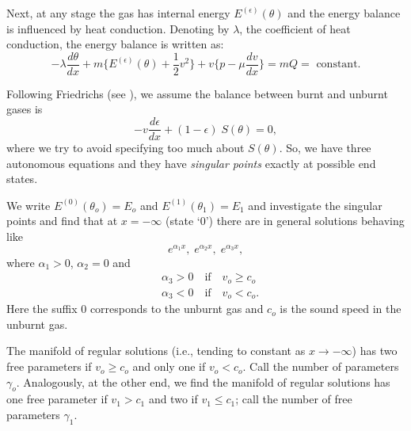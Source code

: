 Next, at any stage the gas has internal energy $E^{(\epsilon)}(\theta)$ and the energy balance is influenced by heat conduction. Denoting by $\lambda$, the coefficient of heat conduction, the energy balance is written as:
$$
-\lambda \frac{d\theta}{dx} + m \{E^{(\epsilon)} (\theta) + \frac{1}{2} v^2\} + v \{p - \mu \frac{dv}{dx}\} = m Q = \text{ constant.}
$$

Following Friedrichs (see \cite{key11}), we assume the balance between burnt and unburnt gases is 
$$
-v\frac{d\epsilon}{dx} + (1-\epsilon) \; S(\theta) = 0,
$$
where we try to avoid specifying too much about $S(\theta)$. So, we have three autonomous equations and they have {\em singular points } exactly at possible end states.

We write $E^{(0)} (\theta_o) = E_o$ and $E^{(1)} (\theta_1) = E_1$ and investigate the singular points and find that at $x = - \infty$ (state `0') there are in general solutions behaving like 
$$
e^{\alpha_1 x}, \; e^{\alpha_2 x}, \; e^{\alpha_3 x},
$$\pageoriginale
where $\alpha_1 > 0$, $\alpha_2 = 0 $ and 
\begin{align*}
& \alpha_3 > 0 \quad \text{if} \quad v_o \geq c_o\\
& \alpha_3 < 0 \quad \text{if} \quad v_o < c_o.
\end{align*}
Here the suffix $0$ corresponds to the unburnt gas and $c_o$ is the sound speed in the unburnt gas.

The manifold of regular solutions (i.e., tending to constant as $x \to - \infty$) has two free parameters if $v_o \geq c_o$ and only one if $v_o < c_o$. Call the number of parameters $\gamma_o$. Analogously, at the other end, we find the manifold of regular solutions has one free parameter if $v_1 > c_1$ and two if $v_1 \leq c_1$; call the number of free parameters $\gamma_1$.

